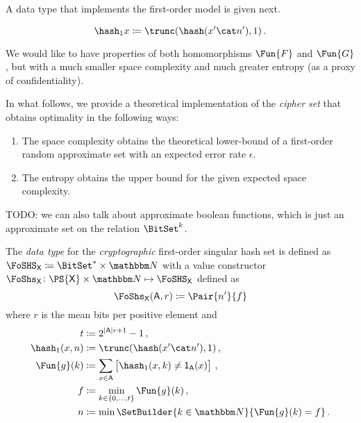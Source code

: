 \documentclass[ ../main.tex]{subfiles}
\begin{document}
A data type that implements the first-order model is given next.


\begin{equation}
\hash_1 x \coloneqq \trunc(\hash (x' \cat n'),1)\,.
\end{equation}




We would like to have properties of both homomorphisms $\Fun{F}$ and $\Fun{G}$, but with a much smaller space complexity and much greater entropy (as a proxy of confidentiality).

In what follows, we provide a theoretical implementation of the \emph{cipher set} that obtains optimality in the following ways:
\begin{enumerate}
	\item The space complexity obtains the theoretical lower-bound of a first-order random approximate set with an expected error rate $\epsilon$.
	\item The entropy obtains the upper bound for the given expected space complexity.
\end{enumerate}

TODO: we can also talk about approximate boolean functions, which is just an approximate set on the relation $\BitSet^k$.

\begin{definition}
\label{alg:makeset}
	The \emph{data type} for the \emph{cryptographic} first-order singular hash set is defined as $\FoSHS_{\Set{X}} \coloneqq \BitSet^* \times \NatSet$ with a value constructor $\FoShs_{\Set{X}} \colon \PS{\Set{X}} \times \NatSet \mapsto \FoSHS_{\Set{X}}$ defined as
	\begin{equation}
	\FoShs_{\Set{X}}(\Set{A},r) \coloneqq \Pair{n'}{f}
	\end{equation}
	where $r$ is the mean bits per positive element and
	\begin{equation}
	\begin{split}
	t			& \coloneqq 2^{\Card{\Set{A}} r+1}-1\,,\\
	\hash_1(x,n)& \coloneqq \trunc(\hash(x' \cat n'),1)\,,\\	
	\Fun{g}(k) 	& \coloneqq \sum_{{x \in \Set{A}}}\left[\hash_1(x,k) \neq \SetIndicator{\Set{A}}(x)\right]\,,\\
	f 			& \coloneqq \min_{k \in \{0,\ldots,t\}} \Fun{g}(k)\,,\\
	n			& \coloneqq \min \SetBuilder{k \in \NatSet}{\Fun{g}(k) = f}\,.\\	
	\end{split}
	\end{equation}
\end{definition}
\end{document}
